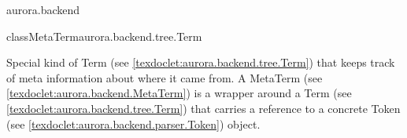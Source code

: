 \begin{texdocpackage}{aurora.backend}
\begin{texdocclass}{class}{MetaTerm}{aurora.backend.tree.Term}{}
\label{texdoclet:aurora.backend.MetaTerm}
\begin{texdocclassintro}
Special kind of Term (see \ref{texdoclet:aurora.backend.tree.Term}) that keeps track of meta information about where it came from.
 A MetaTerm (see \ref{texdoclet:aurora.backend.MetaTerm}) is a wrapper around a Term (see \ref{texdoclet:aurora.backend.tree.Term}) that carries a reference to a concrete Token (see \ref{texdoclet:aurora.backend.parser.Token}) object.\end{texdocclassintro}
\begin{texdocclassfields}
\end{texdocclassfields}
\begin{texdocclassconstructors}
\end{texdocclassconstructors}
\begin{texdocclassmethods}
\end{texdocclassmethods}
\end{texdocclass}



\end{texdocpackage}

